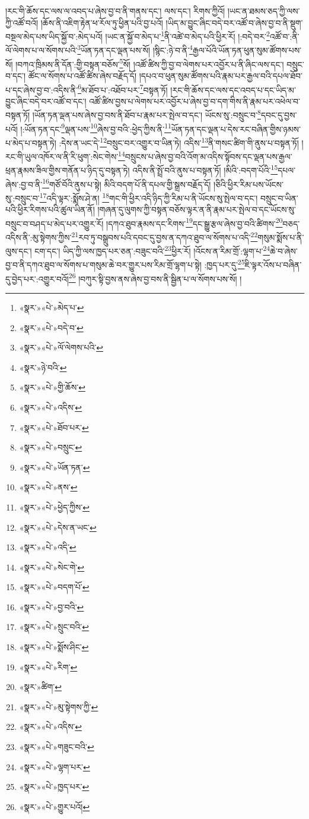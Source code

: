 །རང་གི་ཆོས་དང་ལས་ལ་འབད་པ་ཞེས་བྱ་བ་ནི་གནས་དང་། ལས་དང་། རིགས་ཀྱིའོ། །ཡང་ན་ཐམས་ཅད་ཀྱི་ལས་ཀྱི་འཚོ་བའོ། །ཆོས་ནི་འཇིག་རྟེན་ཕ་རོལ་ཏུ་ཕྱིན་པའི་བྱ་པའོ། །ཡིད་མ་བྱུང་ཞིང་བདེ་བར་འཚོ་བ་ཞེས་བྱ་བ་ནི་སྡུག་བསྔལ་མེད་པས་ཡིད་སྐྱོ་བ་:མེད་པའོ། །ཡང་ན་སྐྱོ་བ་མེད་པ་\footnote{«སྣར་»«པེ་»མེད་པ་}ནི་འཚེ་བ་མེད་པའི་ཕྱིར་རོ། །:བདེ་བར་\footnote{«སྣར་»«པེ་»བདེ་བ་}འཚོ་བ་:ནི་ལོ་ལེགས་པ་ལ་སོགས་པའི་\footnote{«སྣར་»«པེ་»ལོ་ལེགས་པའི་}ཡོན་ཏན་དང་ལྡན་པས་སོ། །སྙིང་:ཉེ་བ་ནི་\footnote{«སྣར་»ཉེ་བའི་}རྒྱལ་པོའི་ཡོན་ཏན་ཕུན་སུམ་ཚོགས་པས་སོ། །བཀའ་ཁྲིམས་ནི་དོན་:གྱི་བསྟན་བཅོས་\footnote{«སྣར་»«པེ་»གྱི་ཆོས་}སོ། །འཚོ་ཚིས་ཀྱི་བྱ་བ་ལེགས་པར་འབྱོར་པ་ནི་ཞིང་ལས་དང་། བསྲུང་བ་དང་། ཚོང་ལ་སོགས་པ་འཚོ་ཚིས་ཞེས་བརྗོད་དོ། །དཔའ་བ་ཕུན་སུམ་ཚོགས་པའི་རྣམ་པར་རྒྱལ་བའི་དཔལ་ཐོབ་པ་དང་ཞེས་བྱ་བ་:འདིས་ནི་\footnote{«སྣར་»«པེ་»འདིས་}མ་ཐོབ་པ་:འཐོབ་པར་\footnote{«སྣར་»«པེ་»ཐོབ་པར་}བསྟན་ཏོ། །རང་གི་ཆོས་དང་ལས་དང་འབད་པ་དང་ཡིད་མ་བྱུང་ཞིང་བདེ་བར་འཚོ་བ་དང་། འཚོ་ཚིས་བྱས་པ་ལེགས་པར་འབྱོར་པ་ཞེས་བྱ་བ་དག་གིས་ནི་རྣམ་པར་འཕེལ་བ་བསྟན་ཏོ། །ཡོན་ཏན་ལྡན་པས་ཞེས་བྱ་བས་ནི་ཐོབ་པ་རྣམ་པར་སྤེལ་བ་དང་། ཡོངས་སུ་:བསྲུང་བ་\footnote{«སྣར་»«པེ་»བསྲུང་}དབང་དུ་བྱས་པའོ། །:ཡོན་ཏན་དང་\footnote{«སྣར་»«པེ་»ཡོན་ཏན་}ལྡན་པས་\footnote{«སྣར་»«པེ་»ནས་}ཞེས་བྱ་བའི་:ཕྱེད་ཀྱིས་ནི་\footnote{«སྣར་»«པེ་»ཕྱེད་ཀྱིས་}ཡོན་ཏན་དང་ལྡན་པ་དེས་རང་བཞིན་གྱིས་ཉམས་པ་མེད་པ་བསྟན་ཏེ། :དེས་ན་ཡང་དེ་\footnote{«སྣར་»«པེ་»དེས་ན་ཡང་}བསྲུང་བར་འགྱུར་བ་ཡིན་ཏེ། འདིས་\footnote{«སྣར་»«པེ་»འདི་}ནི་གསང་ཚིག་གི་ནུས་པ་བསྟན་ཏོ། །རང་གི་ཡུལ་འཁོར་ལ་ནི་རི་ཕུག་:སེང་གེས་\footnote{«སྣར་»«པེ་»སེང་གེ་}བསྲུངས་པ་ཞེས་བྱ་བའི་འོག་མ་འདིས་སྟོབས་དང་ལྡན་པས་རྒྱལ་ཕྲན་རྣམས་ཟིལ་གྱིས་གནོན་པ་ཉིད་དུ་བསྟན་ཏེ། འདིས་ནི་སྤྲོ་བའི་ནུས་པ་བསྟན་ཏོ། །མིའི་:བདག་པོའི་\footnote{«སྣར་»«པེ་»བདག་པོ་}དཔལ་ཞེས་:བྱ་བ་ནི་\footnote{«སྣར་»«པེ་»བྱ་བའི་}གཙོ་བོའི་ནུས་པ་སྟེ། མིའི་བདག་པོ་ནི་དཔལ་གྱི་སྒྲས་བརྗོད་དོ། །ཅིའི་ཕྱིར་རིམ་པས་ཡོངས་སུ་:བསྲུང་བ་\footnote{«སྣར་»«པེ་»སྲུང་བའི་}འདི་ལྟར་:སྨོས་ཤེ་ན། \footnote{«སྣར་»«པེ་»སྨོས་ཤིང་}གང་གི་ཕྱིར་འདི་ཉིད་ཀྱི་རིམ་པ་ནི་ཡོངས་སུ་སྤེལ་བ་དང་། བསྲུང་བ་ཡིན་པའི་ཕྱིར་རིགས་པའི་ཚུལ་ཡིན་ནོ། །གཞན་དུ་ལུགས་ཀྱི་བསྟན་བཅོས་ལྟར་ན་ནི་རྣམ་པར་སྤེལ་བ་དང་ཡོངས་སུ་བསྲུང་བ་བཤད་པ་མེད་པར་འགྱུར་རོ། །དཀའ་ཐུབ་རྣམས་དང་རིགས་\footnote{«སྣར་»«པེ་»རིག་}དང་སྒྱུ་རྩལ་ཞེས་བྱ་བའི་ཚིགས་\footnote{«སྣར་»ཚིག་}བཅད་འདིས་ནི་:མུ་སྟེགས་ཀྱིས་\footnote{«སྣར་»«པེ་»མུ་སྟེགས་ཀྱི་}རབ་ཏུ་བསྒྲུབས་པའི་དབང་དུ་བྱས་ན་དཀའ་ཐུབ་ལ་སོགས་པ་འདི་\footnote{«སྣར་»«པེ་»འདིས་}གསུམ་སྨོས་པ་ནི་ལུས་དང་། ངག་དང་། ཡིད་ཀྱི་ལས་ཁྱད་པར་ཅན་:བཟུང་བའི་\footnote{«སྣར་»«པེ་»གཟུང་བའི་}ཕྱིར་རོ། །འོངས་ན་རིམ་གྲོ་:ལྷག་པ་\footnote{«སྣར་»«པེ་»ལྷག་པར་}ཆེ་བ་ཞེས་བྱ་བ་ནི་དཀའ་ཐུབ་ལ་སོགས་པ་གསུམ་ཆེ་བར་གྱུར་པས་རིམ་གྲོ་ལྷག་པ་སྟེ། :ཁྱད་པར་དུ་\footnote{«སྣར་»«པེ་»ཁྱད་པར་}ཇི་ལྟར་འོས་པ་བཞིན་དུ་བྱེད་པར་:འགྱུར་བའོ།\footnote{«སྣར་»«པེ་»གྱུར་པའོ།} །བཀུར་སྟི་བྱས་ནས་ཞེས་བྱ་བས་ནི་སྦྱིན་པ་ལ་སོགས་པས་སོ། །
